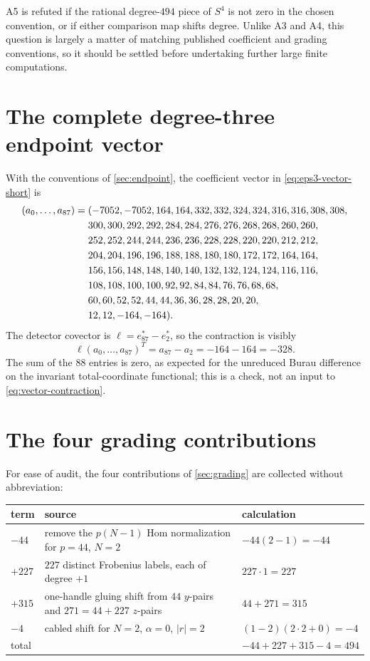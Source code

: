 \documentclass[10pt,reqno]{amsart}
\theoremstyle{definition}
\theoremstyle{remark}
\begin{document}
A5 is refuted if the rational degree-$494$ piece of $S^4$ is not zero in the
chosen convention, or if either comparison map shifts degree.  Unlike A3 and
A4, this question is largely a matter of matching published coefficient and
grading conventions, so it should be settled before undertaking further large
finite computations.

\appendix

\section{The complete degree-three endpoint vector}\label{app:vector}

With the conventions of \cref{sec:endpoint}, the coefficient vector in
\cref{eq:eps3-vector-short} is
\begin{align}
(a_0,\ldots,a_{87})={}&(
-7052,-7052,164,164,332,332,324,324,316,316,308,308,\notag\\
&300,300,292,292,284,284,276,276,268,268,260,260,\notag\\
&252,252,244,244,236,236,228,228,220,220,212,212,\notag\\
&204,204,196,196,188,188,180,180,172,172,164,164,\notag\\
&156,156,148,148,140,140,132,132,124,124,116,116,\notag\\
&108,108,100,100,92,92,84,84,76,76,68,68,\notag\\
&60,60,52,52,44,44,36,36,28,28,20,20,\notag\\
&12,12,-164,-164).
\label{eq:full-88-vector}
\end{align}
The detector covector is $\ell=e_{87}^*-e_2^*$, so the contraction is visibly
\begin{equation}\label{eq:vector-contraction}
\ell(a_0,\ldots,a_{87})^T=a_{87}-a_2=-164-164=-328.
\end{equation}
The sum of the $88$ entries is zero, as expected for the unreduced Burau
difference on the invariant total-coordinate functional; this is a check, not
an input to \cref{eq:vector-contraction}.

\section{The four grading contributions}\label{app:grading}

For ease of audit, the four contributions of \cref{sec:grading} are collected
without abbreviation:
\begin{longtable}{@{}p{}p{}p{}@{}}
\toprule
term & source & calculation\\
\midrule
$-44$ & remove the $p(N-1)$ Hom normalization for $p=44$, $N=2$ & $-44(2-1)=-44$\\
$+227$ & $227$ distinct Frobenius labels, each of degree $+1$ & $227\cdot1=227$\\
$+315$ & one-handle gluing shift from $44$ $y$-pairs and $271=44+227$ $z$-pairs & $44+271=315$\\
$-4$ & cabled shift for $N=2$, $\alpha=0$, $|r|=2$ & $(1-2)(2\cdot2+0)=-4$\\
\midrule
total & & $-44+227+315-4=494$\\
\bottomrule
\end{longtable}
\end{document}
